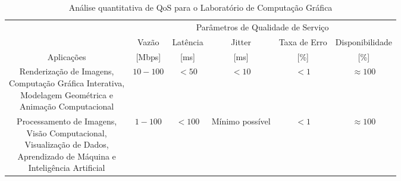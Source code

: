 \begin{table}[H]
  \centering
    \begin{tabular}{cccccc}
        \toprule
        &\multicolumn{5}{c}{Parâmetros de Qualidade de Serviço} \\
        \cmidrule(rl){2-6}
        & Vazão & Latência & Jitter & Taxa de Erro & Disponibilidade\\
        Aplicações & [Mbps] & [ms] & [ms] & [\%] & [\%]\\
        \cmidrule(rl){1-6}
        \makecell{Renderização de Imagens, \\Computação Gráfica Interativa, \\Modelagem Geométrica e \\Animação Computacional} & $10-100$ & $<50$ & $<10$& $<1$ & $\approx100$\\
        \cmidrule(rl){1-6}
        \makecell{Processamento de Imagens, \\Visão Computacional, \\Visualização de Dados, \\Aprendizado de Máquina e \\Inteligência Artificial} & $1-100$ & $<100$ & Mínimo possível & $<1$ & $\approx100$\\
        \bottomrule
    \end{tabular}
    \caption{Análise quantitativa de QoS para o Laboratório de Computação Gráfica}
    \label{tab:qos-cg}
\end{table}
